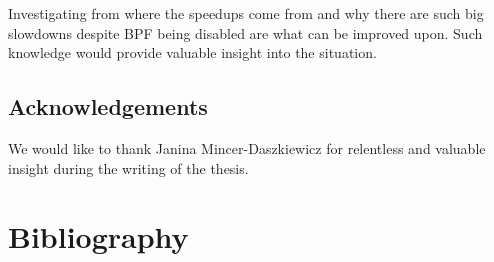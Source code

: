 \documentclass[en]{pracamgr}
\begin{document}
Investigating from where the speedups come from and why there are such big slowdowns despite BPF being disabled are what can be improved upon. Such knowledge would provide valuable insight into the situation.

\section{Acknowledgements}

We would like to thank Janina Mincer-Daszkiewicz for relentless and valuable insight during the writing of the thesis.

\chapter*{Bibliography}
\printbibliography[heading=none]
\end{document}
